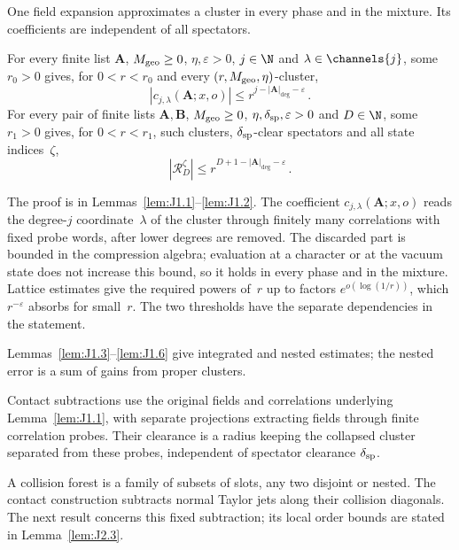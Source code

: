 One field expansion approximates a cluster in every phase and in the mixture. Its coefficients are independent of all spectators.

\begin{theorem}\label{prop:OP}
For every finite list $\boldsymbol A$, $M_{\rm geo}\ge0$, $\eta,\varepsilon>0$, $j\in\N$ and $\lambda\in\channels{j}$, some $r_0>0$ gives, for $0<r<r_0$ and every $(r,M_{\rm geo},\eta)$-cluster,
\begin{equation*}
|c_{j,\lambda}(\boldsymbol A;x,o)|\le r^{j-|\boldsymbol A|_{\deg}-\varepsilon}\,.
\end{equation*}
For every pair of finite lists $\boldsymbol A,\boldsymbol B$, $M_{\rm geo}\ge0$, $\eta,\delta_{\rm sp},\varepsilon>0$ and $D\in\N$, some $r_1>0$ gives, for $0<r<r_1$, such clusters, $\delta_{\rm sp}$-clear spectators and all state indices~$\zeta$,
\begin{equation*}
|\mathcal R_D^\zeta|\le r^{D+1-|\boldsymbol A|_{\deg}-\varepsilon}\,.
\end{equation*}
\end{theorem}

The proof is in Lemmas~\ref{lem:J1.1}--\ref{lem:J1.2}. The coefficient $c_{j,\lambda}(\boldsymbol A;x,o)$ reads the degree-$j$ coordinate~$\lambda$ of the cluster through finitely many correlations with fixed probe words, after lower degrees are removed. The discarded part is bounded in the compression algebra; evaluation at a character or at the vacuum state does not increase this bound, so it holds in every phase and in the mixture. Lattice estimates give the required powers of~$r$ up to factors $e^{o(\log(1/r))}$, which $r^{-\varepsilon}$ absorbs for small~$r$. The two thresholds have the separate dependencies in the statement.

Lemmas~\ref{lem:J1.3}--\ref{lem:J1.6} give integrated and nested estimates; the nested error is a sum of gains from proper clusters.

Contact subtractions use the original fields and correlations underlying Lemma~\ref{lem:J1.1}, with separate projections extracting fields through finite correlation probes. Their clearance is a radius keeping the collapsed cluster separated from these probes, independent of spectator clearance $\delta_{\rm sp}$.

A collision forest is a family of subsets of slots, any two disjoint or nested. The contact construction subtracts normal Taylor jets along their collision diagonals. The next result concerns this fixed subtraction; its local order bounds are stated in Lemma~\ref{lem:J2.3}.

